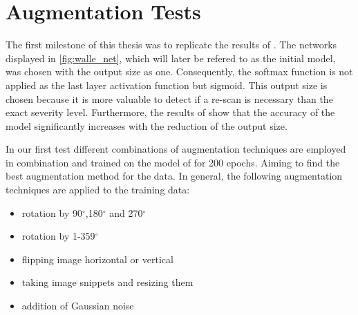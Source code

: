 \documentclass[
a4paper, 
12pt,
grayscalebody, %
abstract=on,
twoside, BCOR10mm, 12pt, DIV13,headinclude, footexclude, final, abstracton, openright
]{ibireprt}
\numberwithin{equation}{chapter}
\numberwithin{table}{chapter}
\numberwithin{figure}{chapter}
\numberwithin{algorithm}{chapter}
\numberwithin{example}{chapter}
\numberwithin{example}{chapter}
\begin{document}
\section{Augmentation Tests}
The first milestone of this thesis was to replicate the results of \citet{Walle2023}. The networks displayed in \ref{fig:walle_net}, which will later be refered to as the initial model, was chosen with the output size as one. Consequently, the softmax function is not applied as the last layer activation function but sigmoid. This output size is chosen because it is more valuable to detect if a re-scan is necessary than the exact severity level. Furthermore, the results of \citet{Walle2023} show that the accuracy of the model significantly increases with the reduction of the output size.

In our first test different combinations of augmentation techniques are employed in combination and trained on the model of \citet{Walle2023} for 200 epochs. Aiming to find the best augmentation method for the data. In general, the following augmentation techniques are applied to the training data: 


\begin{itemize}
	\item rotation by 90$^{\circ}$,180$^{\circ}$ and 270$^{\circ}$
	\item rotation by 1-359$^{\circ}$
	\item flipping image horizontal or vertical 
	\item taking image snippets and resizing them 
	\item addition of Gaussian noise 
\end{itemize}
\end{document}
